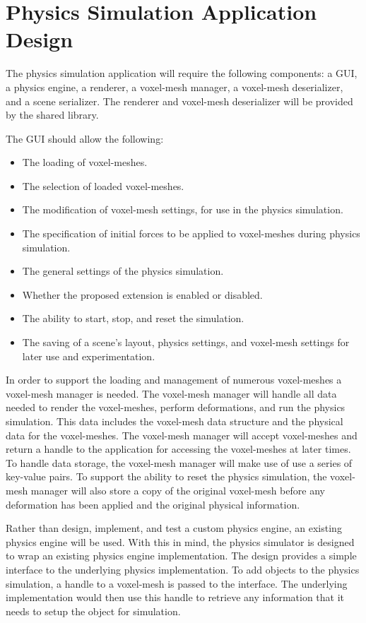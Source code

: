 

\section{Physics Simulation Application Design}

The physics simulation application will require the following components: a GUI, a physics 
engine, a renderer, a voxel-mesh manager, a voxel-mesh deserializer, and a scene serializer. The 
renderer and voxel-mesh deserializer will be provided by the shared library.

The GUI should allow the following:

\begin{itemize}
  \item The loading of voxel-meshes.
  \item The selection of loaded voxel-meshes.
  \item The modification of voxel-mesh settings, for use in the physics simulation.
  \item The specification of initial forces to be applied to voxel-meshes during physics simulation.
  \item The general settings of the physics simulation.
  \item Whether the proposed extension is enabled or disabled.
  \item The ability to start, stop, and reset the simulation.
  \item The saving of a scene's layout, physics settings, and voxel-mesh settings for later use and
  experimentation.
\end{itemize}

In order to support the loading and management of numerous voxel-meshes a voxel-mesh manager is 
needed. The voxel-mesh manager will handle all data needed to render the voxel-meshes, perform
deformations, and run the physics simulation. This data includes the voxel-mesh data structure and
the physical data for the voxel-meshes. The voxel-mesh manager will accept voxel-meshes and return a 
handle to the application for accessing the voxel-meshes at later times. 
To handle data storage, the voxel-mesh manager will make use of use a series of key-value pairs. To 
support the ability to reset the physics simulation, the voxel-mesh manager will also store a
copy of the original voxel-mesh before any deformation has been applied and the original physical 
information.

Rather than design, implement, and test a custom physics engine, an existing physics engine will be
used. With this in mind, the physics simulator is designed to wrap an existing physics engine 
implementation. The design provides a simple interface to the underlying physics implementation. To 
add objects to the physics simulation, a handle to a voxel-mesh is passed to the interface. The 
underlying implementation would then use this handle to retrieve any information that it needs to 
setup the object for simulation. 

